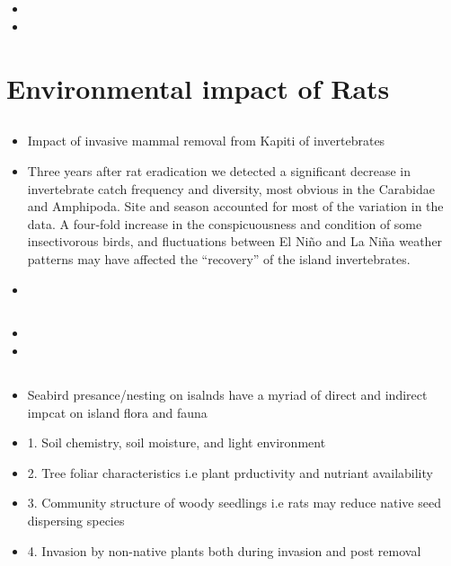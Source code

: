 \documentclass[document.tex]{subfiles}
\begin{document}
    \subsection{\citetitle{}}
    \begin{itemize}
    \item 
    \item 
    \end{itemize}


\section{Environmental impact of Rats}

    \subsection{}
    \begin{itemize}
    \item Impact of invasive mammal removal from Kapiti of invertebrates
    \item Three years after rat eradication we detected a significant decrease in invertebrate catch frequency and diversity, most obvious in the Carabidae and Amphipoda. Site and season accounted for most of the variation in the data. A four‐fold increase in the conspicuousness and condition of some insectivorous birds, and fluctuations between El Niño and La Niña weather patterns may have affected the “recovery” of the island invertebrates. 
    \item 
    \end{itemize}


    \subsection{}
    \begin{itemize}
    \item 
    \item 
    \end{itemize}


    \subsection{}
    \begin{itemize}
    \item Seabird presance/nesting on isalnds have a myriad of direct and indirect impcat on island flora and fauna 
    \item 1. Soil chemistry, soil moisture, and light environment
    \item 2. Tree foliar characteristics i.e plant prductivity and nutriant availability
    \item 3. Community structure of woody seedlings i.e rats may reduce native seed dispersing species
    \item 4. Invasion by non-native plants both during invasion and post removal
    \end{itemize}
\end{document}
